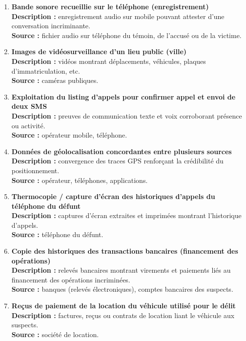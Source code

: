 \documentclass[12pt]{article}
\begin{document}
\begin{enumerate}[label=\textbf{E\arabic* —}, leftmargin=2cm]
\item \textbf{Bande sonore recueillie sur le téléphone (enregistrement)} \\
\textbf{Description :} enregistrement audio sur mobile pouvant attester d’une conversation incriminante. \\
\textbf{Source :} fichier audio sur téléphone du témoin, de l’accusé ou de la victime.

\item \textbf{Images de vidéosurveillance d’un lieu public (ville)} \\
\textbf{Description :} vidéos montrant déplacements, véhicules, plaques d’immatriculation, etc. \\
\textbf{Source :} caméras publiques.

\item \textbf{Exploitation du listing d’appels pour confirmer appel et envoi de deux SMS} \\
\textbf{Description :} preuves de communication texte et voix corroborant présence ou activité. \\
\textbf{Source :} opérateur mobile, téléphone.

\item \textbf{Données de géolocalisation concordantes entre plusieurs sources} \\
\textbf{Description :} convergence des traces GPS renforçant la crédibilité du positionnement. \\
\textbf{Source :} opérateur, téléphones, applications.

\item \textbf{Thermocopie / capture d’écran des historiques d’appels du téléphone du défunt} \\
\textbf{Description :} captures d’écran extraites et imprimées montrant l’historique d’appels. \\
\textbf{Source :} téléphone du défunt.

\item \textbf{Copie des historiques des transactions bancaires (financement des opérations)} \\
\textbf{Description :} relevés bancaires montrant virements et paiements liés au financement des opérations incriminées. \\
\textbf{Source :} banques (relevés électroniques), comptes bancaires des suspects.

\item \textbf{Reçus de paiement de la location du véhicule utilisé pour le délit} \\
\textbf{Description :} factures, reçus ou contrats de location liant le véhicule aux suspects. \\
\textbf{Source :} société de location.

\end{enumerate}
\end{document}
